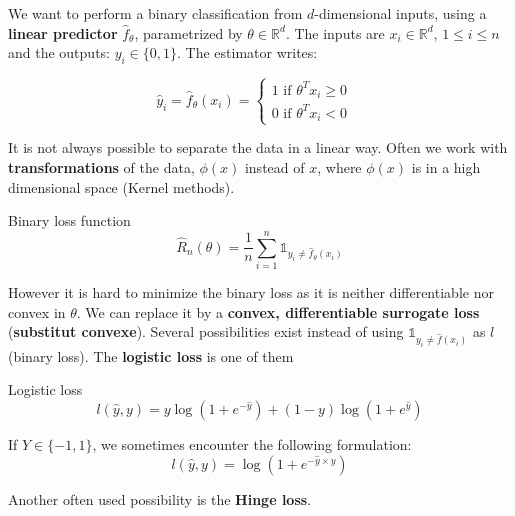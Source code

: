 \documentclass[
10pt, %
a4paper, %
oneside, %
headinclude,footinclude, %
BCOR5mm, %
]{scrartcl}
\begin{document}
We want to perform a binary classification from $d$-dimensional inputs, using a
\textbf{{linear predictor}} $\hat{f}_{\theta}$, parametrized by $\theta\in \mathbb{R}^d$. The inputs are $x_i \in \mathbb{R}^d$, $1\leq i \leq n$ and the outputs: $y_i\in \{0, 1\}$. The estimator writes:

$$
\hat{y}_i = \hat{f}_{\theta}(x_i)=\left\{
    \begin{array}{ll}
	1 \text{ if } \theta^Tx_i \geq 0 & \\
        0 \text{ if } \theta^Tx_i < 0& 
    \end{array}
\right.
$$

\begin{remark}
    It is not always possible to separate the data in a linear way. Often we work with \textbf{{transformations}} of the data, $\phi(x)$ instead of $x$, where $\phi(x)$ is in a high dimensional space (Kernel methods).
\end{remark}

\begin{definition}{Binary loss function}
    \begin{equation*}
	\hat{R}_n(\theta) = \frac{1}{n} \sum^{n}_{i=1} \mathbb{1}_{y_i\neq \hat{f}_{\theta}(x_i)}    
    \end{equation*}
\end{definition}

However it is hard to minimize the binary loss as it is neither differentiable nor convex in $\theta$. We can replace it by a \textbf{{convex, differentiable surrogate loss}} (\textbf{{substitut convexe}}). Several possibilities exist instead of using $ \mathbb{1}_{y_i\neq \hat{f}(x_i)}    $ as $l$ (binary loss). The \textbf{{logistic loss}} is one of them 

\begin{definition}{Logistic loss}
    \label{loss:logistic}
	\begin{equation}
	    l(\hat{y}, y) = y\log(1+e^{- \hat{y}})+ (1-y)\log(1+e^{ \hat{y}})
	\end{equation}
\end{definition}

\begin{remark}
    If $Y\in \{-1, 1\}$, we sometimes encounter the following formulation:
	\begin{equation*}
	    l(\hat{y}, y) = \log(1+e^{- \hat{y}\times y})
	\end{equation*}
\end{remark}

Another often used possibility is the \textbf{{Hinge loss}}.
\end{document}
